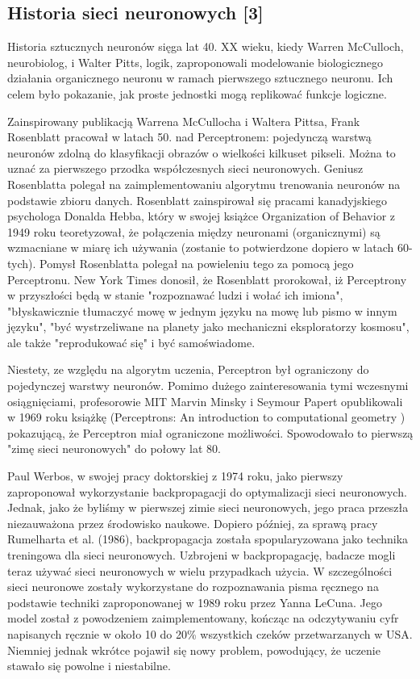 \documentclass{article}
\begin{document}
\subsection{Historia sieci neuronowych [3]}


Historia sztucznych neuronów sięga lat 40. XX wieku, kiedy Warren McCulloch, neurobiolog, i Walter Pitts, logik, zaproponowali modelowanie biologicznego działania organicznego neuronu w ramach pierwszego sztucznego neuronu.
Ich celem było pokazanie, jak proste jednostki mogą replikować funkcje logiczne.


Zainspirowany publikacją Warrena McCullocha i Waltera Pittsa, Frank Rosenblatt pracował w latach 50. nad Perceptronem: pojedynczą warstwą neuronów zdolną do klasyfikacji obrazów o wielkości kilkuset pikseli.
Można to uznać za pierwszego przodka współczesnych sieci neuronowych.
Geniusz Rosenblatta polegał na zaimplementowaniu algorytmu trenowania neuronów na podstawie zbioru danych.
Rosenblatt zainspirował się pracami kanadyjskiego psychologa Donalda Hebba, który w swojej książce Organization of Behavior z 1949 roku teoretyzował, że połączenia między neuronami (organicznymi) są wzmacniane w miarę ich używania (zostanie to potwierdzone dopiero w latach 60-tych).
Pomysł Rosenblatta polegał na powieleniu tego za pomocą jego Perceptronu.
New York Times donosił, że Rosenblatt prorokował, iż Perceptrony w przyszłości będą w stanie "rozpoznawać ludzi i wołać ich imiona", "błyskawicznie tłumaczyć mowę w jednym języku na mowę lub pismo w innym języku", "być wystrzeliwane na planety jako mechaniczni eksploratorzy kosmosu", ale także "reprodukować się" i być samoświadome.

Niestety, ze względu na algorytm uczenia, Perceptron był ograniczony do pojedynczej warstwy neuronów.
Pomimo dużego zainteresowania tymi wczesnymi osiągnięciami, profesorowie MIT Marvin Minsky i Seymour Papert opublikowali w 1969 roku książkę (Perceptrons: An introduction to computational geometry ) pokazującą, że Perceptron miał ograniczone możliwości.
Spowodowało to pierwszą "zimę sieci neuronowych" do połowy lat 80.

Paul Werbos, w swojej pracy doktorskiej z 1974 roku, jako pierwszy zaproponował wykorzystanie backpropagacji do optymalizacji sieci neuronowych.
Jednak, jako że byliśmy w pierwszej zimie sieci neuronowych, jego praca przeszła niezauważona przez środowisko naukowe.
Dopiero później, za sprawą pracy Rumelharta et al. (1986), backpropagacja została spopularyzowana jako technika treningowa dla sieci neuronowych.
Uzbrojeni w backpropagację, badacze mogli teraz używać sieci neuronowych w wielu przypadkach użycia.
W szczególności sieci neuronowe zostały wykorzystane do rozpoznawania pisma ręcznego na podstawie techniki zaproponowanej w 1989 roku przez Yanna LeCuna.
Jego model został z powodzeniem zaimplementowany, kończąc na odczytywaniu cyfr napisanych ręcznie w około 10 do 20\% wszystkich czeków przetwarzanych w USA.
Niemniej jednak wkrótce pojawił się nowy problem, powodujący, że uczenie stawało się powolne i niestabilne.
\end{document}
